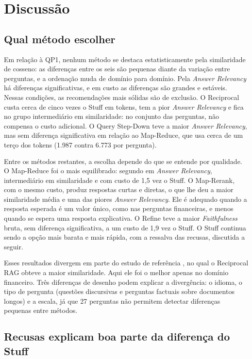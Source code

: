 \section{Discussão}
\label{sc:discussao}

\subsection{Qual método escolher}

Em relação à QP1, nenhum método se destaca estatisticamente pela similaridade de cosseno: as diferenças entre os seis são pequenas diante da variação entre perguntas, e a ordenação muda de domínio para domínio. Pela \emph{Answer Relevancy} há diferenças significativas, e em custo as diferenças são grandes e estáveis. Nessas condições, as recomendações mais sólidas são de exclusão. O Reciprocal custa cerca de cinco vezes o Stuff em tokens, tem a pior \emph{Answer Relevancy} e fica no grupo intermediário em similaridade: no conjunto das perguntas, não compensa o custo adicional. O Query Step-Down teve a maior \emph{Answer Relevancy}, mas sem diferença significativa em relação ao Map-Reduce, que usa cerca de um terço dos tokens (1.987 contra 6.773 por pergunta).

Entre os métodos restantes, a escolha depende do que se entende por qualidade. O Map-Reduce foi o mais equilibrado: segundo em \emph{Answer Relevancy}, intermediário em similaridade e com custo de 1,5 vez o Stuff. O Map-Rerank, com o mesmo custo, produz respostas curtas e diretas, o que lhe deu a maior similaridade média e uma das piores \emph{Answer Relevancy}. Ele é adequado quando a resposta esperada é um valor único, como nas perguntas financeiras, e menos quando se espera uma resposta explicativa. O Refine teve a maior \emph{Faithfulness} bruta, sem diferença significativa, a um custo de 1,9 vez o Stuff. O Stuff continua sendo a opção mais barata e mais rápida, com a ressalva das recusas, discutida a seguir.

Esses resultados divergem em parte do estudo de referência \cite{sakar2025rag}, no qual o Reciprocal RAG obteve a maior similaridade. Aqui ele foi o melhor apenas no domínio financeiro. Três diferenças de desenho podem explicar a divergência: o idioma, o tipo de pergunta (questões discursivas e perguntas factuais sobre documentos longos) e a escala, já que 27 perguntas não permitem detectar diferenças pequenas entre métodos.

\subsection{Recusas explicam boa parte da diferença do Stuff}

